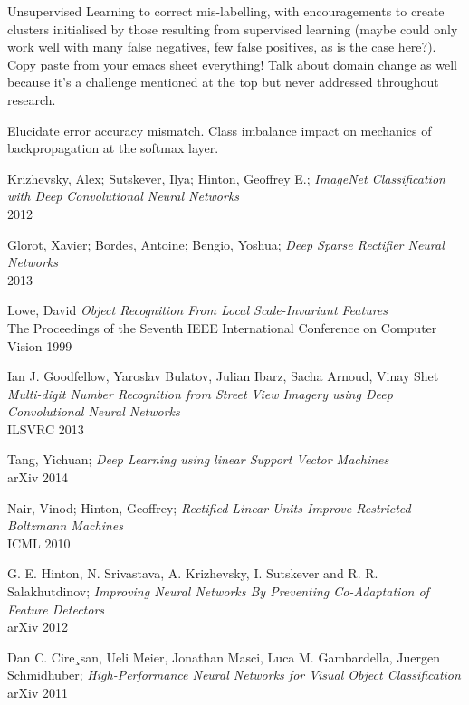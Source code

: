 \documentclass[a4paper,11pt]{article}
\begin{document}
Unsupervised Learning to correct mis-labelling, with encouragements to create clusters initialised by those resulting from supervised learning (maybe could only work well with many false negatives, few false positives, as is the case here?). \\ 

Copy paste from your emacs sheet everything! Talk about domain change as well because it's a challenge mentioned at the top but never addressed throughout research.

Elucidate error accuracy mismatch. Class imbalance impact on mechanics of backpropagation at the softmax layer.

\begin{thebibliography}{1}

 Krizhevsky, Alex; Sutskever, Ilya; Hinton, Geoffrey E.;
 \emph{ImageNet Classification with Deep Convolutional Neural Networks}\\
 2012

 Glorot, Xavier; Bordes, Antoine; Bengio, Yoshua;
 \emph{Deep Sparse Rectifier Neural Networks}\\
 2013
 
 Lowe, David
 \emph{Object Recognition From Local Scale-Invariant Features}\\
 The Proceedings of the Seventh IEEE International Conference on Computer Vision
 1999 
 
 Ian J. Goodfellow, Yaroslav Bulatov, Julian Ibarz, Sacha Arnoud, Vinay Shet
  \emph{Multi-digit Number Recognition from Street View Imagery using Deep Convolutional Neural Networks}\\
  ILSVRC 2013

 Tang, Yichuan;
 \emph{Deep Learning using linear Support Vector Machines}\\
 arXiv 2014

 Nair, Vinod; Hinton, Geoffrey;
  \emph{Rectified Linear Units Improve Restricted Boltzmann Machines}\\
  ICML 2010

 G. E. Hinton, N. Srivastava, A. Krizhevsky, I. Sutskever and R. R. Salakhutdinov;
 \emph{Improving Neural Networks By Preventing Co-Adaptation of Feature Detectors}\\
 arXiv 2012

 Dan C. Cire¸san, Ueli Meier, Jonathan Masci, Luca M. Gambardella, Juergen Schmidhuber;
 \emph{High-Performance Neural Networks for Visual Object Classification}\\
 arXiv 2011


\end{thebibliography}
\end{document}
